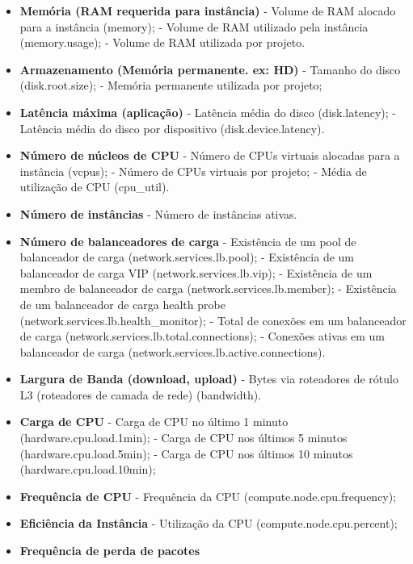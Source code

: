 \documentclass[conference]{IEEEtran}
\begin{document}
\begin{itemize}
 \item \textbf{Memória (RAM requerida para instância)}
    \subitem - Volume de RAM alocado para a instância (memory);
    \subitem - Volume de RAM utilizado pela instância (memory.usage);
    \subitem - Volume de RAM utilizada por projeto.
 \item \textbf{Armazenamento (Memória permanente. ex: HD)}
    \subitem - Tamanho do disco  (disk.root.size);
    \subitem - Memória permanente utilizada por projeto;
 \item \textbf{Latência máxima  (aplicação)}
    \subitem - Latência média do disco (disk.latency);
    \subitem - Latência média do disco por dispositivo (disk.device.latency).
 \item \textbf{Número de núcleos de CPU}
    \subitem - Número de CPUs virtuais alocadas para a instância (vcpus);
    \subitem - Número de CPUs virtuais por projeto;
    \subitem - Média de utilização de CPU (cpu\_util).
 \item \textbf{Número de instâncias}
    \subitem - Número de instâncias ativas.
 \item \textbf{Número de balanceadores de carga}
    \subitem - Existência de um pool de balanceador de carga (network.services.lb.pool);
    \subitem - Existência de um balanceador de carga VIP (network.services.lb.vip);
    \subitem - Existência de um membro de balanceador de carga (network.services.lb.member);
    \subitem - Existência de um balanceador de carga health probe (network.services.lb.health\_monitor);
    \subitem - Total de conexões em um balanceador de carga (network.services.lb.total.connections);
    \subitem - Conexões ativas em um balanceador de carga (network.services.lb.active.connections).
  \item \textbf{Largura de Banda (download, upload)}
    \subitem - Bytes via roteadores de rótulo L3 (roteadores de camada de rede) (bandwidth).
  \item \textbf{Carga de CPU}   
    \subitem - Carga de CPU no último 1 minuto (hardware.cpu.load.1min);
    \subitem - Carga de CPU nos últimos 5 minutos (hardware.cpu.load.5min);
    \subitem - Carga de CPU nos últimos 10 minutos (hardware.cpu.load.10min);
  \item \textbf{Frequência de CPU}  
    \subitem - Frequência da CPU (compute.node.cpu.frequency);
  \item \textbf{Eficiência da Instância}    
    \subitem - Utilização da CPU (compute.node.cpu.percent);
  \item \textbf{Frequência de perda de pacotes}   

\end{itemize}
\end{document}
